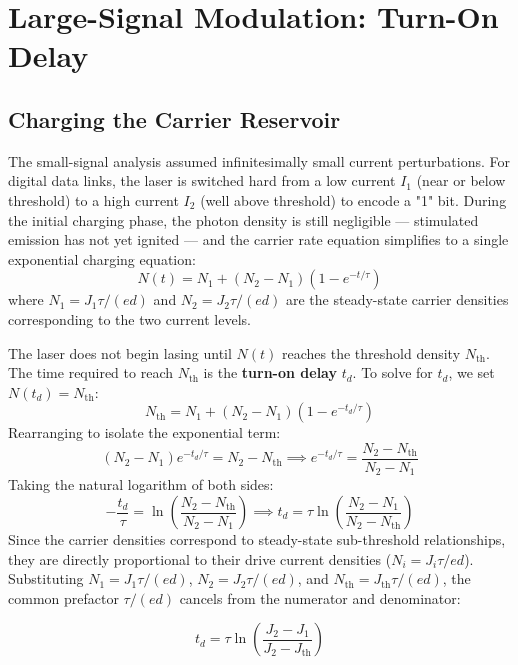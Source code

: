 \section{Large-Signal Modulation: Turn-On Delay}

\subsection{Charging the Carrier Reservoir}

The small-signal analysis assumed infinitesimally small current perturbations. For digital data links, the laser is switched hard from a low current $I_1$ (near or below threshold) to a high current $I_2$ (well above threshold) to encode a "1" bit. During the initial charging phase, the photon density is still negligible — stimulated emission has not yet ignited — and the carrier rate equation simplifies to a single exponential charging equation:
\begin{equation*}
    N(t) = N_1 + (N_2 - N_1)\left(1 - e^{-t/\tau}\right)
\end{equation*}
where $N_1 = J_1\tau/(ed)$ and $N_2 = J_2\tau/(ed)$ are the steady-state carrier densities corresponding to the two current levels.

The laser does not begin lasing until $N(t)$ reaches the threshold density $N_\text{th}$. The time required to reach $N_\text{th}$ is the \textbf{turn-on delay} $t_d$. To solve for $t_d$, we set $N(t_d) = N_\text{th}$:
\begin{equation*}
    N_\text{th} = N_1 + (N_2 - N_1)\left(1 - e^{-t_d/\tau}\right)
\end{equation*}
Rearranging to isolate the exponential term:
\begin{equation*}
    (N_2 - N_1)e^{-t_d/\tau} = N_2 - N_\text{th} \implies e^{-t_d/\tau} = \frac{N_2 - N_\text{th}}{N_2 - N_1}
\end{equation*}
Taking the natural logarithm of both sides:
\begin{equation*}
    -\frac{t_d}{\tau} = \ln\!\left(\frac{N_2 - N_\text{th}}{N_2 - N_1}\right) \implies t_d = \tau \ln\!\left(\frac{N_2 - N_1}{N_2 - N_\text{th}}\right)
\end{equation*}
Since the carrier densities correspond to steady-state sub-threshold relationships, they are directly proportional to their drive current densities ($N_i = J_i\tau/ed$). Substituting $N_1 = J_1\tau/(ed)$, $N_2 = J_2\tau/(ed)$, and $N_\text{th} = J_\text{th}\tau/(ed)$, the common prefactor $\tau/(ed)$ cancels from the numerator and denominator:
\begin{keyresult}
    \begin{equation}
        t_d = \tau\ln\!\left(\frac{J_2 - J_1}{J_2 - J_\text{th}}\right)
    \end{equation}
\end{keyresult}

